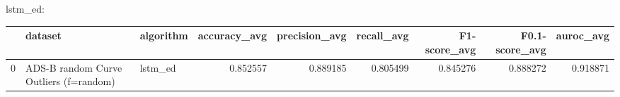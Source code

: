 lstm_ed:

\begin{tabular}{rllrrrrrr}
\hline
    & dataset                                & algorithm   &   accuracy\_avg &   precision\_avg &   recall\_avg &   F1-score\_avg &   F0.1-score\_avg &   auroc\_avg \\
\hline
  0 & ADS-B random Curve Outliers (f=random) & lstm\_ed     &       0.852557 &        0.889185 &     0.805499 &       0.845276 &         0.888272 &    0.918871 \\
\hline
\end{tabular}

